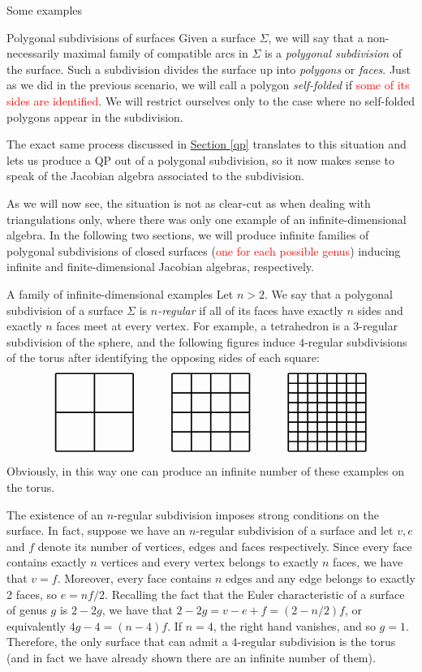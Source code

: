 \begin{chapter}{Some examples}
\begin{section}{Polygonal subdivisions of surfaces}
Given a surface $\Sigma$, we will say that a non-necessarily maximal family of compatible arcs in $\Sigma$ is a \emph{polygonal subdivision} of the surface. Such a subdivision divides the surface up into \emph{polygons} or \emph{faces}. Just as we did in the previous scenario, we will call a polygon \emph{self-folded} if \textcolor{red}{some of its sides are identified}. We will restrict ourselves only to the case where no self-folded polygons appear in the subdivision.

The exact same process discussed in \hyperref[qp]{Section \ref*{qp}} translates to this situation and lets us produce a QP out of a polygonal subdivision, so it now makes sense to speak of the Jacobian algebra associated to the subdivision.

As we will now see, the situation is not as clear-cut as when dealing with triangulations only, where there was only one example of an infinite-dimensional algebra. In the following two sections, we will produce infinite families of polygonal subdivisions of closed surfaces (\textcolor{red}{one for each possible genus}) inducing infinite and finite-dimensional Jacobian algebras, respectively.
\end{section}

\begin{section}{A family of infinite-dimensional examples}
Let $n>2$. We say that a polygonal subdivision of a surface $\Sigma$ is \emph{$n$-regular} if all of its faces have exactly $n$ sides and exactly $n$ faces meet at every vertex. For example, a tetrahedron is a $3$-regular subdivision of the sphere, and the following figures induce $4$-regular subdivisions of the torus after identifying the opposing sides of each square:
\[
\begin{tikzpicture}[scale=1.2, very thick]
\Square{-3}{0}
\Square{0}{0}
\Square{3}{0}
\draw (-3,-1) to (-3,1);
\draw (-4,0) to (-2,0);

\foreach \x in {-0.5,0,0.5}
{
\draw (\x, -1) to (\x, 1);
\draw (-1, \x) to (1, \x);
}

\foreach \x in {-0.75,-0.5, ..., 0.75}
{
\draw (3+\x, -1) to (3+\x, 1);
\draw (2, \x) to (4, \x);
}
\end{tikzpicture}
\]
Obviously, in this way one can produce an infinite number of these examples on the torus.

The existence of an $n$-regular subdivision imposes strong conditions on the surface. In fact, suppose we have an $n$-regular subdivision of a surface and let $v, e$ and $f$ denote its number of vertices, edges and faces respectively. Since every face contains exactly $n$ vertices and every vertex belongs to exactly $n$ faces, we have that $v=f$. Moreover, every face contains $n$ edges and any edge belongs to exactly 2 faces, so $e=nf/2$.
Recalling the fact that the Euler characteristic of a surface of genus $g$ is $2-2g$, we have that $2-2g=v-e+f=(2-n/2)f$, or equivalently $4g-4 = (n-4)f$. If $n=4$, the right hand vanishes, and so $g=1$. Therefore, the only surface that can admit a $4$-regular subdivision is the torus (and in fact we have already shown there are an infinite number of them).


\end{section}
\end{chapter}
